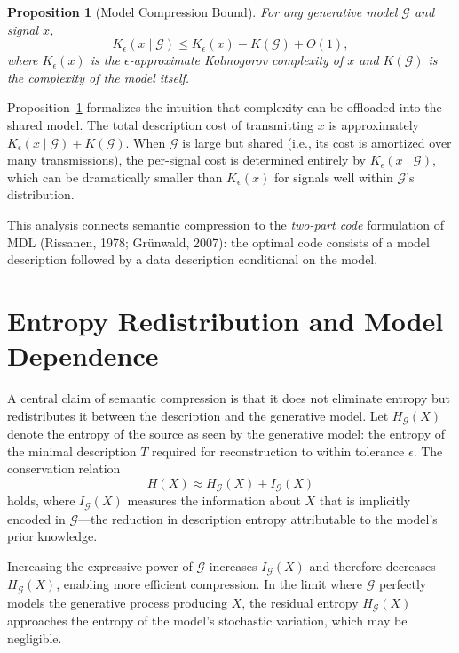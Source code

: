 \documentclass[11pt,a4paper]{article}
\newtheorem{proposition}[theorem]{Proposition}
\theoremstyle{definition}
\theoremstyle{remark}
\begin{document}
\begin{proposition}[Model Compression Bound]
\label{prop:kolmogorov}
For any generative model $\mathcal{G}$ and signal $x$,
\[
K_\epsilon(x \mid \mathcal{G}) \le K_\epsilon(x) - K(\mathcal{G}) + O(1),
\]
where $K_\epsilon(x)$ is the $\epsilon$-approximate Kolmogorov complexity of $x$ and $K(\mathcal{G})$ is the complexity of the model itself.
\end{proposition}

Proposition~\ref{prop:kolmogorov} formalizes the intuition that complexity can be offloaded into the shared model. The total description cost of transmitting $x$ is approximately $K_\epsilon(x \mid \mathcal{G}) + K(\mathcal{G})$. When $\mathcal{G}$ is large but shared (i.e., its cost is amortized over many transmissions), the per-signal cost is determined entirely by $K_\epsilon(x \mid \mathcal{G})$, which can be dramatically smaller than $K_\epsilon(x)$ for signals well within $\mathcal{G}$'s distribution.

This analysis connects semantic compression to the \emph{two-part code} formulation of MDL (Rissanen, 1978; Gr\"{u}nwald, 2007): the optimal code consists of a model description followed by a data description conditional on the model.

\section{Entropy Redistribution and Model Dependence}
\label{sec:entropy}

A central claim of semantic compression is that it does not eliminate entropy but redistributes it between the description and the generative model. Let $H_{\mathcal{G}}(X)$ denote the entropy of the source as seen by the generative model: the entropy of the minimal description $T$ required for reconstruction to within tolerance $\epsilon$. The conservation relation
\[
H(X) \approx H_{\mathcal{G}}(X) + I_{\mathcal{G}}(X)
\]
holds, where $I_{\mathcal{G}}(X)$ measures the information about $X$ that is implicitly encoded in $\mathcal{G}$---the reduction in description entropy attributable to the model's prior knowledge.

Increasing the expressive power of $\mathcal{G}$ increases $I_{\mathcal{G}}(X)$ and therefore decreases $H_{\mathcal{G}}(X)$, enabling more efficient compression. In the limit where $\mathcal{G}$ perfectly models the generative process producing $X$, the residual entropy $H_{\mathcal{G}}(X)$ approaches the entropy of the model's stochastic variation, which may be negligible.
\end{document}
